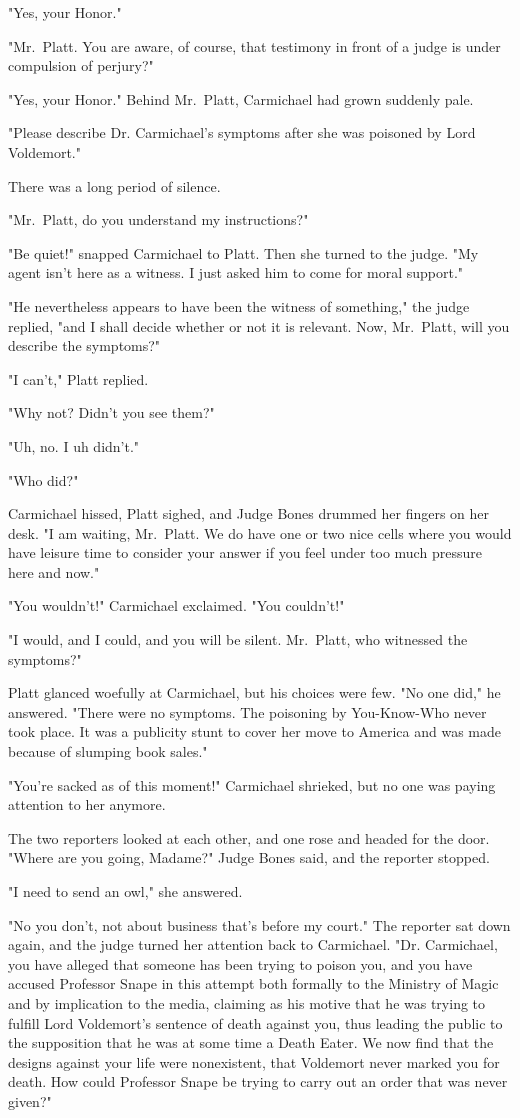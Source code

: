 "Yes, your Honor."

"Mr.~Platt. You are aware, of course, that testimony in front of a judge is under compulsion of perjury?"

"Yes, your Honor." Behind Mr.~Platt, Carmichael had grown suddenly pale.

"Please describe Dr. Carmichael's symptoms after she was poisoned by Lord Voldemort."

There was a long period of silence.

"Mr.~Platt, do you understand my instructions?"

"Be quiet!" snapped Carmichael to Platt. Then she turned to the judge. "My agent isn't here as a witness. I just asked him to come for moral support."

"He nevertheless appears to have been the witness of something," the judge replied, "and I shall decide whether or not it is relevant. Now, Mr.~Platt, will you describe the symptoms?"

"I can't," Platt replied.

"Why not? Didn't you see them?"

"Uh, no. I{\el} uh{\el} didn't."

"Who did?"

Carmichael hissed, Platt sighed, and Judge Bones drummed her fingers on her desk. "I am waiting, Mr.~Platt. We do have one or two nice cells where you would have leisure time to consider your answer if you feel under too much pressure here and now."

"You wouldn't!" Carmichael exclaimed. "You couldn't!"

"I would, and I could, and you will be silent. Mr.~Platt, who witnessed the symptoms?"

Platt glanced woefully at Carmichael, but his choices were few. "No one did," he answered. "There were no symptoms. The poisoning by You-Know-Who never took place. It was a publicity stunt to cover her move to America and was made because of slumping book sales."

"You're sacked as of this moment!" Carmichael shrieked, but no one was paying attention to her anymore.

The two reporters looked at each other, and one rose and headed for the door. "Where are you going, Madame?" Judge Bones said, and the reporter stopped.

"I need to send an owl," she answered.

"No you don't, not about business that's before my court." The reporter sat down again, and the judge turned her attention back to Carmichael. "Dr. Carmichael, you have alleged that someone has been trying to poison you, and you have accused Professor Snape in this attempt both formally to the Ministry of Magic and by implication to the media, claiming as his motive that he was trying to fulfill Lord Voldemort's sentence of death against you, thus leading the public to the supposition that he was at some time a Death Eater. We now find that the designs against your life were nonexistent, that Voldemort never marked you for death. How could Professor Snape be trying to carry out an order that was never given?"

